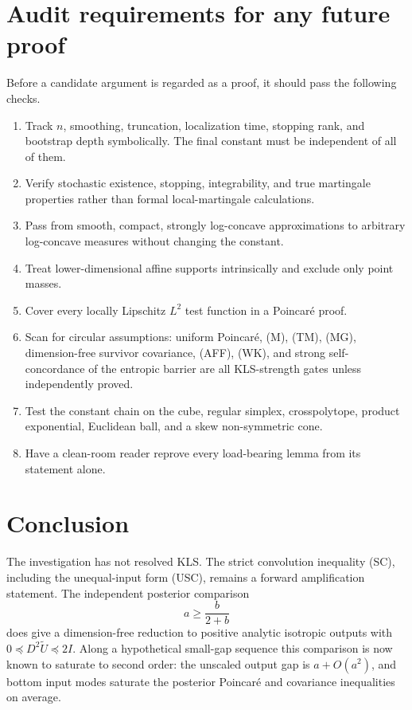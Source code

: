 \documentclass[11pt]{article}
\theoremstyle{definition}
\theoremstyle{remark}
\newcommand{\1}{\mathbf 1}
\begin{document}
\section{Audit requirements for any future proof}

Before a candidate argument is regarded as a proof, it should pass the
following checks.

\begin{enumerate}
\item Track \(n\), smoothing, truncation, localization time, stopping rank,
and bootstrap depth symbolically.  The final constant must be independent
of all of them.
\item Verify stochastic existence, stopping, integrability, and true
martingale properties rather than formal local-martingale calculations.
\item Pass from smooth, compact, strongly log-concave approximations to
arbitrary log-concave measures without changing the constant.
\item Treat lower-dimensional affine supports intrinsically and exclude
only point masses.
\item Cover every locally Lipschitz \(L^2\) test function in a Poincar\'e
proof.
\item Scan for circular assumptions: uniform Poincar\'e, (M), (TM), (MG),
dimension-free survivor covariance, (AFF), (WK), and strong
self-concordance of the entropic barrier are all KLS-strength gates unless
independently proved.
\item Test the constant chain on the cube, regular simplex, crosspolytope,
product exponential, Euclidean ball, and a skew non-symmetric cone.
\item Have a clean-room reader reprove every load-bearing lemma from its
statement alone.
\end{enumerate}

\section{Conclusion}

The investigation has not resolved KLS.  The strict convolution inequality
(SC), including the unequal-input form (USC), remains a forward
amplification statement.  The independent posterior comparison
\[
 a\ge\frac{b}{2+b}
\]
does give a dimension-free reduction to positive analytic isotropic
outputs with \(0\preceq D^2\widetilde U\preceq2I\).  Along a hypothetical
small-gap sequence this comparison is now known to saturate to second
order: the unscaled output gap is \(a+O(a^2)\), and bottom input modes
saturate the posterior Poincar\'e and covariance inequalities on average.
\end{document}
